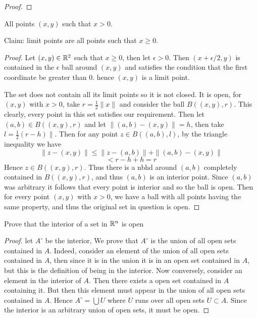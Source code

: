 \begin{alphaparts}
\begin{proof}
         \end{proof}

        \questionpart 
        All points $(x, y)$ such that $x > 0$. 

        Claim: limit points are all points such that $x \geq 0$. 

        \begin{proof}
            Let $(x, y) \in \mathbb{R}^2$ such that $x \geq 0$, then let $\epsilon > 0$. 
            Then $(x + \epsilon/2, y)$ is contained in the $\epsilon$ ball around 
            $(x, y)$ and satisfies the condition that the first coordinate be greater than $0$. 
            hence $(x, y)$ is a limit point. 


            The set does not contain all its limit points so it is not closed. 
            It is open, for $(x, y)$ with $x > 0$, take $r = \frac{1}{2} \| x \|$ and 
            consider the ball $B((x, y), r)$. This clearly, every point in this set satisfies 
            our requirement. Then let $(a, b) \in B((x, y), r)$ and let $\| (a, b) - (x, y) \| = h$, then take $l = \frac{1}{2}(r - h) \|$. 
            Then for any point $z \in B((a, b), l)$, by the triangle inequality we have 
            \[ \|z - (x, y) \| \leq \|z - (a, b) \| + \| (a, b) - (x, y) \| \]
            \[ < r - h + h = r\]
            Hence $z \in B((x, y), r)$. Thus there is a  nbhd around $(a, b)$ completely contained in $B((x, y), r)$, and thus $(a, b)$ is an interior 
            point. Since $(a, b)$ was arbitrary it follows that every point is interior and so the ball is open. Then for every point $(x, y)$ with $x > 0$, 
            we have a ball with all points having the same property, and thus the original set in question is open.
        \end{proof}
    \end{alphaparts}


    \question 
    Prove that the interior of a set in $\mathbb{R}^n$ is open 

    \begin{proof}
        let $A^\circ $ be the interior, We prove that $A^\circ$ is the union of all open sets contained in $A$. Indeed, consider an element of the union of 
        all open sets contained in $A$, then since it is in the union it is in an open set contained in $A$, but this is the definition of being in the interior. 
        Now conversely, consider an element in the interior of $A$. Then there exists a open set contained in $A$ containing it. But then 
        this element must appear in the union of all open sets contained in $A$. Hence $A^\circ = \bigcup U$ where $U$ runs over all open sets $U \subset A$. 
        Since the interior is an arbitrary union of open sets, it must be open.  
    \end{proof}


